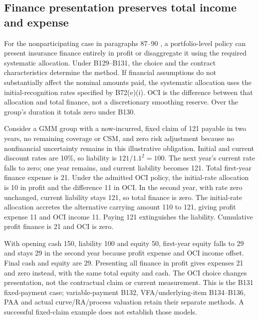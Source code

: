\hypertarget{finance-presentation-preserves-total-income-and-expense}{%
\subsection{Finance presentation preserves total income and expense}\label{finance-presentation-preserves-total-income-and-expense}}

For the nonparticipating case in paragraphs 87--90 \citep[IFRS~17.87--91 and B128--132]{eu20231803}, a portfolio-level policy can present insurance finance entirely in profit or disaggregate it using the required systematic allocation. Under B129--B131, the choice and the contract characteristics determine the method. If financial assumptions do not substantially affect the nominal amounts paid, the systematic allocation uses the initial-recognition rates specified by B72(e)(i). OCI is the difference between that allocation and total finance, not a discretionary smoothing reserve. Over the group's duration it totals zero under B130.

Consider a GMM group with a now-incurred, fixed claim of 121 payable in two years, no remaining coverage or CSM, and zero risk adjustment because no nonfinancial uncertainty remains in this illustrative obligation. Initial and current discount rates are 10\%, so liability is \(121/1.1^2=100\). The next year's current rate falls to zero; one year remains, and current liability becomes 121. Total first-year finance expense is 21. Under the admitted OCI policy, the initial-rate allocation is 10 in profit and the difference 11 in OCI. In the second year, with rate zero unchanged, current liability stays 121, so total finance is zero. The initial-rate allocation accretes the alternative carrying amount 110 to 121, giving profit expense 11 and OCI income 11. Paying 121 extinguishes the liability. Cumulative profit finance is 21 and OCI is zero.

With opening cash 150, liability 100 and equity 50, first-year equity falls to 29 and stays 29 in the second year because profit expense and OCI income offset. Final cash and equity are 29. Presenting all finance in profit gives expenses 21 and zero instead, with the same total equity and cash. The OCI choice changes presentation, not the contractual claim or current measurement. This is the B131 fixed-payment case; variable-payment B132, VFA/underlying-item B134--B136, PAA and actual curve/RA/process valuation retain their separate methods. A successful fixed-claim example does not establish those models.
